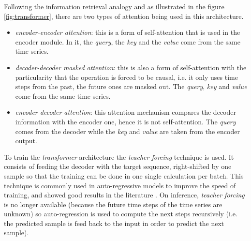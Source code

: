 \documentclass{elsarticle}
\begin{document}
	Following the information retrieval analogy and as illustrated in the figure \ref{fig:transformer}, there are two types of attention being used in this architecture.
	\begin{itemize}
		\item \textit{encoder-encoder attention}: this is a form of self-attention that is used in the encoder module. In it, the \textit{query}, the \textit{key} and the \textit{value} come from the same time series.
		\item \textit{decoder-decoder masked attention}: this is also a form of self-attention with the particularity that the operation is forced to be causal, i.e. it only uses time steps from the past, the future ones are masked out. The \textit{query}, \textit{key} and \textit{value} come from the same time series.
		\item \textit{encoder-decoder attention}: this attention mechanism compares the decoder information with the encoder one, hence it is not self-attention. The \textit{query} comes from the decoder while the \textit{key} and \textit{value} are taken from the encoder output.
	\end{itemize}
	
	To train the \textit{transformer} architecture the \textit{teacher forcing} technique \cite{williams1989, goyal2016} is used. It consists of feeding the decoder with the target sequence, right-shifted by one sample so that the training can be done in one single calculation per batch. This technique is commonly used in auto-regressive models to improve the speed of training, and showed good results in the literature \cite{vaswani2017}. On inference, \textit{teacher forcing} is no longer available (because the future time steps of the time series are unknown) so auto-regression is used to compute the next steps recursively (i.e. the predicted sample is feed back to the input in order to predict the next sample).
    
\end{document}
